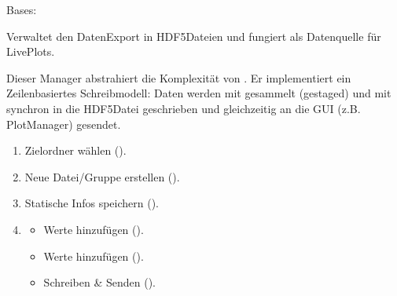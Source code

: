 \documentclass[letterpaper,10pt,english]{sphinxmanual}
\begin{document}
\begin{fulllineitems}
\label{\detokenize{modulab/export_manager:modules.export.ExportManager.ExportManager}}
\pysigstartsignatures
\pysiglinewithargsret
{}
{\sphinxparamcomma {}}
{}
\pysigstopsignatures
\sphinxAtStartPar
Bases: 

\sphinxAtStartPar
Verwaltet den Daten\sphinxhyphen{}Export in HDF5\sphinxhyphen{}Dateien und fungiert als Datenquelle für Live\sphinxhyphen{}Plots.

\sphinxAtStartPar
Dieser Manager abstrahiert die Komplexität von . Er implementiert ein
Zeilen\sphinxhyphen{}basiertes Schreibmodell: Daten werden mit  gesammelt (gestaged)
und mit  synchron in die HDF5\sphinxhyphen{}Datei geschrieben und gleichzeitig
an die GUI (z.B. PlotManager) gesendet.
\begin{description}
\begin{enumerate}
%
\item {} 
\sphinxAtStartPar
{} Zielordner wählen ().

\item {} 
\sphinxAtStartPar
{} Neue Datei/Gruppe erstellen ().

\item {} 
\sphinxAtStartPar
{} Statische Infos speichern ().

\item {} \begin{description}
\begin{itemize}
\item {} 
\sphinxAtStartPar
Werte hinzufügen ().

\item {} 
\sphinxAtStartPar
Werte hinzufügen ().

\item {} 
\sphinxAtStartPar
Schreiben \& Senden ().


\end{itemize}
\end{description}
\end{enumerate}
\end{description}
\end{fulllineitems}
\end{document}
